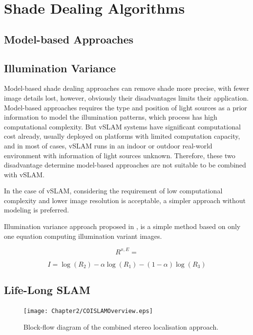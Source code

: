 \section{Shade Dealing Algorithms}

\subsection{Model-based Approaches}

\subsection{Illumination Variance}
Model-based shade dealing approaches can remove shade more precise, with fewer image details lost, however, obviously their disadvantages limits their application. Model-based approaches requires the type and position of light sources as a prior information to model the illumination patterns, which process has high computational complexity. But vSLAM systems have significant computational cost already, usually deployed on platforms with limited computation capacity, and in most of cases, vSLAM runs in an indoor or outdoor real-world environment with  information of light sources unknown. Therefore,  these two disadvantage determine model-based approaches are not suitable to be combined with vSLAM.

In the case of vSLAM, considering the requirement of low computational complexity and lower image resolution is acceptable, a simpler approach without modeling is preferred. 

Illumination variance approach proposed in \cite{maddern2014illumination}, is a simple method based on only one equation computing illumination variant images.



 \cite{mcmanus2014shady} \cite{arroyo2016openable}
 
 \begin{equation}
 R^{x,E}=
 \end{equation}
 
\begin{equation}
I=\log(R_2)-\alpha\log(R_1)-(1-\alpha)\log(R_3)
\label{eq:iifinal}
\end{equation}

\subsection{Life-Long SLAM}

\begin{figure}[H]
	\centering
	\texttt{[image: Chapter2/COISLAMOverview.eps]}
	\caption{Block-flow diagram of the combined stereo localisation approach.}
	\label{fig:coislamoverview} 
\end{figure}

\newpage
